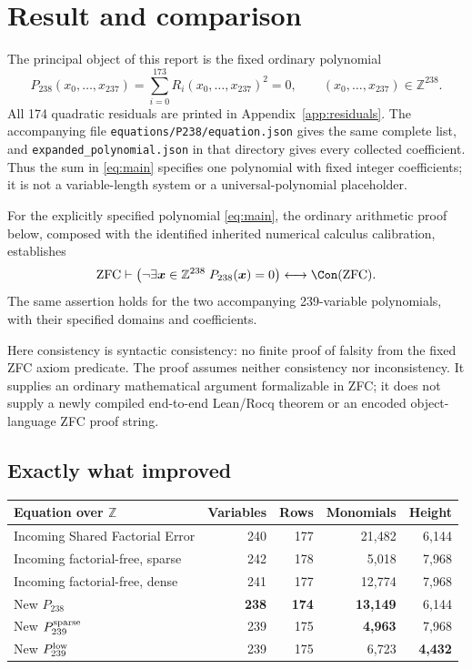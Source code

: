 \section{Result and comparison}

The principal object of this report is the fixed ordinary polynomial
\begin{equation}\label{eq:main}
 \boxed{P_{238}(x_0,\ldots,x_{237})
       =\sum_{i=0}^{173} R_i(x_0,\ldots,x_{237})^2=0,
       \qquad (x_0,\ldots,x_{237})\in\mathbb Z^{238}.}
\end{equation}
All 174 quadratic residuals are printed in Appendix~\ref{app:residuals}.
The accompanying file \nolinkurl{equations/P238/equation.json} gives the
same complete list, and \nolinkurl{expanded_polynomial.json} in that
directory gives every collected coefficient. Thus the sum in
\eqref{eq:main} specifies one polynomial with fixed integer coefficients;
it is not a variable-length system or a universal-polynomial placeholder.

\begin{theorem}\label{thm:main}
For the explicitly specified polynomial \eqref{eq:main}, the ordinary
arithmetic proof below, composed with the identified inherited numerical
calculus calibration, establishes
\[
 \mathrm{ZFC}\vdash
 \left(\neg\exists\boldsymbol x\in\mathbb Z^{238}\;
                 P_{238}(\boldsymbol x)=0\right)
 \longleftrightarrow\Con(\mathrm{ZFC}).
\]
The same assertion holds for the two accompanying 239-variable
polynomials, with their specified domains and coefficients.
\end{theorem}

Here consistency is syntactic consistency: no finite proof of falsity from
the fixed ZFC axiom predicate. The proof assumes neither consistency nor
inconsistency. It supplies an ordinary mathematical argument formalizable
in ZFC; it does not supply a newly compiled end-to-end Lean/Rocq theorem
or an encoded object-language ZFC proof string.

\subsection{Exactly what improved}

\begin{center}\small
\begin{tabular}{lrrrr}
\toprule
Equation over $\mathbb Z$ & Variables & Rows & Monomials & Height\\
\midrule
Incoming Shared Factorial Error &240&177&21,482&6,144\\
Incoming factorial-free, sparse &242&178&5,018&7,968\\
Incoming factorial-free, dense &241&177&12,774&7,968\\
\midrule
New $P_{238}$ &\textbf{238}&\textbf{174}&\textbf{13,149}&6,144\\
New $P_{239}^{\rm sparse}$ &239&175&\textbf{4,963}&7,968\\
New $P_{239}^{\rm low}$ &239&175&6,723&\textbf{4,432}\\
\bottomrule
\end{tabular}
\end{center}

